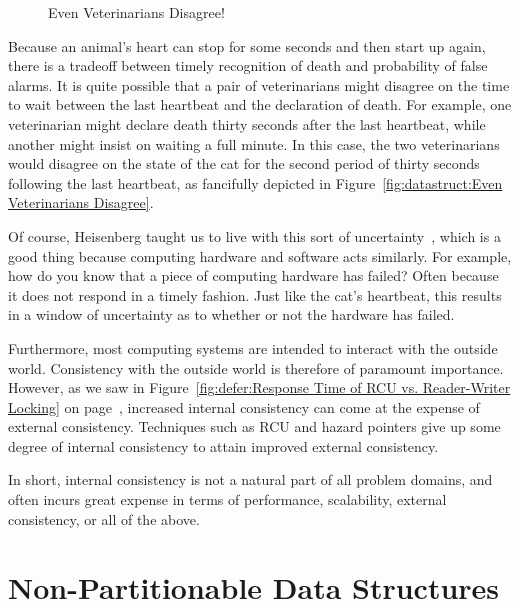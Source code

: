 \begin{figure}[tb]
\centering
{}
\caption{Even Veterinarians Disagree!}
\end{figure}

Because an animal's heart can stop for some seconds and then start up
again, there is a tradeoff between timely recognition of death and
probability of false alarms.
It is quite possible that a pair of veterinarians might disagree on
the time to wait between the last heartbeat and the declaration of
death.
For example, one veterinarian might declare death thirty seconds after
the last heartbeat, while another might insist on waiting a full
minute.
In this case, the two veterinarians would disagree on the state of the
cat for the second period of thirty seconds following the last heartbeat,
as fancifully depicted in
Figure~\ref{fig:datastruct:Even Veterinarians Disagree}.

Of course, Heisenberg taught us to live with this sort of
uncertainty~\cite{WeinerHeisenberg1927Uncertain}, which is a good
thing because computing hardware and software acts similarly.
For example, how do you know that a piece of computing hardware
has failed?
Often because it does not respond in a timely fashion.
Just like the cat's heartbeat, this results in a window of
uncertainty as to whether or not the hardware has failed.

Furthermore, most computing systems are intended to interact with
the outside world.
Consistency with the outside world is therefore of paramount importance.
However, as we saw in
Figure~\ref{fig:defer:Response Time of RCU vs. Reader-Writer Locking}
on
page~\pageref{fig:defer:Response Time of RCU vs. Reader-Writer Locking},
increased internal consistency can come at the expense of external
consistency.
Techniques such as RCU and hazard pointers give up some degree of
internal consistency to attain improved external consistency.

In short, internal consistency is not a natural part of all problem domains,
and often incurs great expense in terms of performance,
scalability, external consistency, or all of the above.

\section{Non-Partitionable Data Structures}
\label{sec:datastruct:Non-Partitionable Data Structures}

